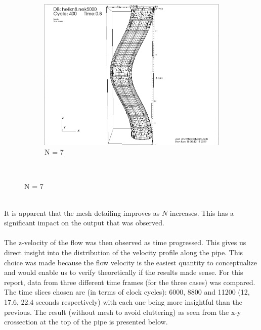 \documentclass[12pt]{article}
\begin{document}
\begin{figure}[h]
\begin{subfigure}[h]{0.400\textwidth}
		\includegraphics[width=\textwidth]{mesh8.png}
		\caption{N = 7}
	\end{subfigure}\\ 
\end{figure}\\
It is apparent that the mesh detailing improves as $N$ increases. This has a significant impact on the output that was observed. \\\\

The z-velocity of the flow was then observed as time progressed. This gives us direct insight into the distribution of the velocity profile along the pipe. This choice was made because the flow velocity is the easiest quantity to conceptualize and would enable us to verify theoretically if the results made sense. For this report, data from three different time frames (for the three cases) was compared. The time slices chosen are (in terms of clock cycles): 6000, 8800 and 11200 (12, 17.6, 22.4 seconds respectively) with each one being more insightful than the previous. The result (without mesh to avoid cluttering) as seen from the x-y crossection at the top of the pipe is presented below.\\
 
\end{document}
